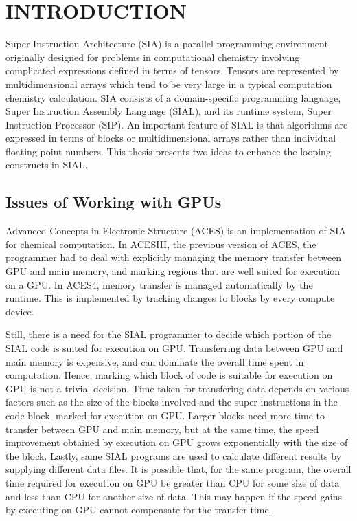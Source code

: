 \chapter{INTRODUCTION}\label{intro}
Super Instruction Architecture (SIA) is a parallel programming environment
originally designed for problems in computational chemistry involving complicated
expressions defined in terms of tensors. Tensors are represented by
multidimensional arrays which tend to be very large in a typical computation chemistry
calculation. SIA consists of a
domain-specific programming language, Super Instruction Assembly Language
(SIAL), and its runtime system, Super Instruction Processor (SIP). An important
feature of SIAL is that algorithms are expressed in terms of blocks or
multidimensional arrays rather than individual floating point numbers. This thesis
presents two ideas to enhance the looping constructs in SIAL.

\section{Issues of Working with GPUs}
Advanced Concepts in Electronic Structure (ACES) is an implementation of SIA for
chemical computation.
In ACESIII, the previous version of ACES, the programmer had to deal with explicitly managing
the memory transfer between GPU and main memory, and marking regions that are well suited for execution
on a GPU. In ACES4, memory transfer is managed automatically by the runtime.
This is implemented by tracking changes to blocks by every compute device.

Still, there is a need for the SIAL programmer to decide which portion of the SIAL code
is suited for execution on GPU. Transferring data between GPU and main memory is
expensive, and can dominate the overall time spent in computation. Hence, marking
which block of code is suitable for execution on GPU is not
a trivial decision. Time taken for transfering data depends on various factors such as
the size of the blocks involved and the super instructions in the code-block, marked
for execution on GPU.
Larger blocks need more time to transfer between GPU and main memory, but at the
same time, the speed improvement obtained by execution on GPU grows
exponentially with the size of the block. Lastly, same SIAL programs are used to
calculate different results by supplying different data files. It is possible that,
for the same program, the overall time required for execution on GPU be greater
than CPU for some size of data and less than CPU for another size of data.
This may happen if the speed gains by executing on GPU cannot compensate for the
transfer time.

